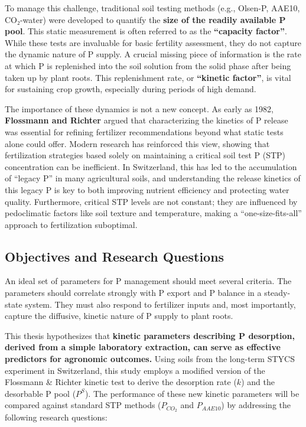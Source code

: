 \documentclass[
  a4paper,
]{article}
\begin{document}
To manage this challenge, traditional soil testing methods (e.g.,
Olsen-P, AAE10, CO₂-water) were developed to quantify the \textbf{size
of the readily available P pool}. This static measurement is often
referred to as the \textbf{``capacity factor''}. While these tests are
invaluable for basic fertility assessment, they do not capture the
dynamic nature of P supply. A crucial missing piece of information is
the rate at which P is replenished into the soil solution from the solid
phase after being taken up by plant roots. This replenishment rate, or
\textbf{``kinetic factor''}, is vital for sustaining crop growth,
especially during periods of high demand.

The importance of these dynamics is not a new concept. As early as 1982,
\textbf{Flossmann and Richter} argued that characterizing the kinetics
of P release was essential for refining fertilizer recommendations
beyond what static tests alone could offer. Modern research has
reinforced this view, showing that fertilization strategies based solely
on maintaining a critical soil test P (STP) concentration can be
inefficient. In Switzerland, this has led to the accumulation of
``legacy P'' in many agricultural soils, and understanding the release
kinetics of this legacy P is key to both improving nutrient efficiency
and protecting water quality. Furthermore, critical STP levels are not
constant; they are influenced by pedoclimatic factors like soil texture
and temperature, making a ``one-size-fits-all'' approach to
fertilization suboptimal.

\subsection{Objectives and Research
Questions}\label{objectives-and-research-questions}

An ideal set of parameters for P management should meet several
criteria. The parameters should correlate strongly with P export and P
balance in a steady-state system. They must also respond to fertilizer
inputs and, most importantly, capture the diffusive, kinetic nature of P
supply to plant roots.

This thesis hypothesizes that \textbf{kinetic parameters describing P
desorption, derived from a simple laboratory extraction, can serve as
effective predictors for agronomic outcomes.} Using soils from the
long-term STYCS experiment in Switzerland, this study employs a modified
version of the Flossmann \& Richter kinetic test to derive the
desorption rate (\(k\)) and the desorbable P pool (\(P^S\)). The
performance of these new kinetic parameters will be compared against
standard STP methods (\(P_{CO_2}\) and \(P_{AAE10}\)) by addressing the
following research questions:
\end{document}
